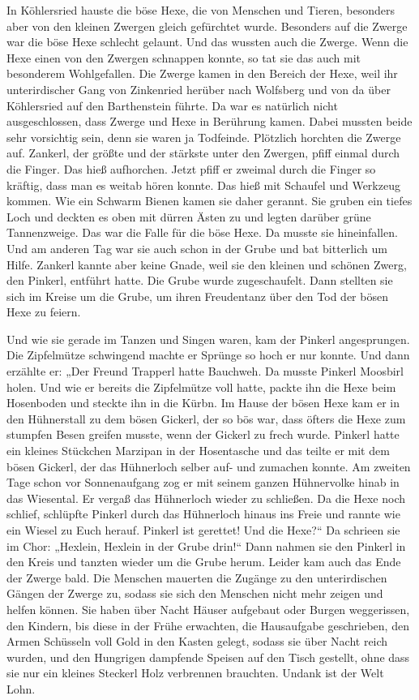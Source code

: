 \documentclass[12pt,a4pager]{book}
\begin{document}
In Köhlersried hauste die böse Hexe, die von Menschen und Tieren, besonders aber
von den kleinen Zwergen gleich gefürchtet wurde. Besonders auf die Zwerge war
die böse Hexe schlecht gelaunt. Und das wussten auch die Zwerge. Wenn die Hexe
einen von den Zwergen schnappen konnte, so tat sie das auch mit besonderem
Wohlgefallen. Die Zwerge kamen in den Bereich der Hexe, weil ihr unterirdischer
Gang von Zinkenried herüber nach Wolfsberg und von da über Köhlersried auf den
Barthenstein führte. Da war es natürlich nicht ausgeschlossen, dass Zwerge und
Hexe in Berührung kamen. Dabei mussten beide sehr vorsichtig sein, denn sie
waren ja Todfeinde. Plötzlich horchten die Zwerge auf. Zankerl, der größte und
der stärkste unter den Zwergen, pfiff einmal durch die Finger. Das hieß
aufhorchen. Jetzt pfiff er zweimal durch die Finger so kräftig, dass man es
weitab hören konnte. Das hieß mit Schaufel und Werkzeug kommen. Wie ein Schwarm
Bienen kamen sie daher gerannt. Sie gruben ein tiefes Loch und deckten es oben
mit dürren Ästen zu und legten darüber grüne Tannenzweige. Das war die Falle für
die böse Hexe. Da musste sie hineinfallen. Und am anderen Tag war sie auch schon
in der Grube und bat bitterlich um Hilfe. Zankerl kannte aber keine Gnade, weil
sie den kleinen und schönen Zwerg, den Pinkerl, entführt hatte. Die Grube wurde
zugeschaufelt. Dann stellten sie sich im Kreise um die Grube, um ihren
Freudentanz über den Tod der bösen Hexe zu feiern.

Und wie sie gerade im Tanzen und Singen waren, kam der Pinkerl angesprungen. Die
Zipfelmütze schwingend machte er Sprünge so hoch er nur konnte. Und dann
erzählte er: „Der Freund Trapperl hatte Bauchweh. Da musste Pinkerl Moosbirl
holen. Und wie er bereits die Zipfelmütze voll hatte, packte ihn die Hexe beim
Hosenboden und steckte ihn in die Kürbn. Im Hause der bösen Hexe kam er in den
Hühnerstall zu dem bösen Gickerl, der so bös war, dass öfters die Hexe zum
stumpfen Besen greifen musste, wenn der Gickerl zu frech wurde. Pinkerl hatte
ein kleines Stückchen Marzipan in der Hosentasche und das teilte er mit dem
bösen Gickerl, der das Hühnerloch selber auf- und zumachen konnte. Am zweiten
Tage schon vor Sonnenaufgang zog er mit seinem ganzen Hühnervolke hinab in das
Wiesental. Er vergaß das Hühnerloch wieder zu schließen. Da die Hexe noch
schlief, schlüpfte Pinkerl durch das Hühnerloch hinaus ins Freie und rannte wie
ein Wiesel zu Euch herauf. Pinkerl ist gerettet! Und die Hexe?“ Da schrieen sie
im Chor: „Hexlein, Hexlein in der Grube drin!“ Dann nahmen sie den Pinkerl in
den Kreis und tanzten wieder um die Grube herum. Leider kam auch das Ende der
Zwerge bald. Die Menschen mauerten die Zugänge zu den unterirdischen Gängen der
Zwerge zu, sodass sie sich den Menschen nicht mehr zeigen und helfen können. Sie
haben über Nacht Häuser aufgebaut oder Burgen weggerissen, den Kindern, bis
diese in der Frühe erwachten, die Hausaufgabe geschrieben, den Armen Schüsseln
voll Gold in den Kasten gelegt, sodass sie über Nacht reich wurden, und den
Hungrigen dampfende Speisen auf den Tisch gestellt, ohne dass sie nur ein
kleines Steckerl Holz verbrennen brauchten. Undank ist der Welt Lohn.
\end{document}
